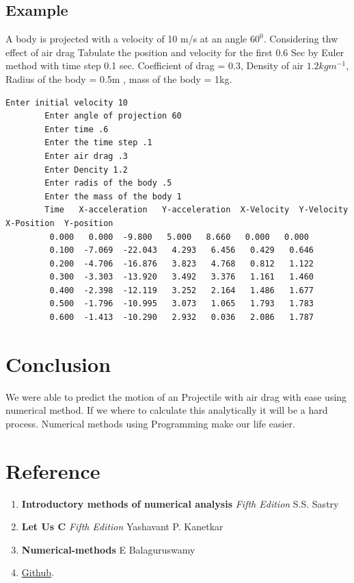 \documentclass[12pt,a4paper]{article}
\begin{document}
	\subsection{Example }
	A body is projected with a velocity of 10 m/s at an angle \(60^0\). Considering thw effect of air drag Tabulate the position and velocity for the first 0.6 Sec by Euler method with time step 0.1 sec. Coefficient of drag  = 0.3, Density of air \(1.2 kg m^{-1}\), Radius of the body = 0.5m , mass of the body = 1kg.
	\begin{lstlisting}[style=CStyle]
		Enter initial velocity 10
		Enter angle of projection 60
		Enter time .6
		Enter the time step .1
		Enter air drag .3 
		Enter Dencity 1.2
		Enter radis of the body .5
		Enter the mass of the body 1
		Time   X-acceleration   Y-acceleration  X-Velocity  Y-Velocity  X-Position  Y-position
		 0.000   0.000  -9.800   5.000   8.660   0.000   0.000 
		 0.100  -7.069  -22.043   4.293   6.456   0.429   0.646 
		 0.200  -4.706  -16.876   3.823   4.768   0.812   1.122 
		 0.300  -3.303  -13.920   3.492   3.376   1.161   1.460 
		 0.400  -2.398  -12.119   3.252   2.164   1.486   1.677 
		 0.500  -1.796  -10.995   3.073   1.065   1.793   1.783 
		 0.600  -1.413  -10.290   2.932   0.036   2.086   1.787 
	\end{lstlisting}

\section{Conclusion }
We were able to predict the motion of an Projectile with air drag with ease using numerical method. If we where to calculate this analytically it will be a hard process. Numerical methods using Programming make our life easier.
\section{Reference}
\begin{enumerate}
	\item \textbf{Introductory methods of numerical analysis} \textit{Fifth Edition}	 S.S. Sastry 
	\item \textbf{Let Us C } \textit{Fifth Edition} Yashavant P. Kanetkar
	\item \textbf{Numerical-methods} \textit{} E Balaguruswamy
	\item \href{https://github.com/athulkrishna2015/projectile-motion-with-air-drag}{Github}. 
\end{enumerate}
	
\end{document}
